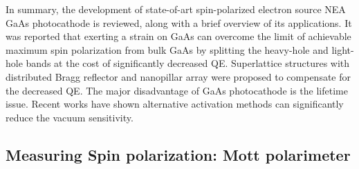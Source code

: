 In summary, the development of state-of-art spin-polarized electron source NEA GaAs photocathode is reviewed, along with a brief overview of its applications. It was reported that exerting a strain on GaAs can overcome the limit of achievable maximum spin polarization from bulk GaAs by splitting the heavy-hole and light-hole bands at the cost of significantly decreased QE. Superlattice structures with distributed Bragg reflector and nanopillar array were proposed to compensate for the decreased QE. The major disadvantage of GaAs photocathode is the lifetime issue. Recent works have shown alternative activation methods can significantly reduce the vacuum sensitivity.


\subsection{Measuring Spin polarization:  Mott polarimeter}

